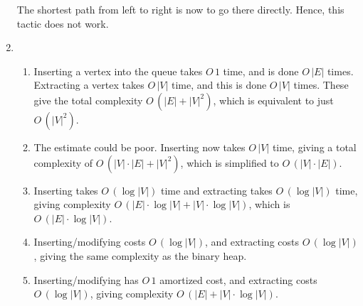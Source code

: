 \documentclass[11pt]{article}
\begin{document}
\begin{enumerate}

  The shortest path from left to right is now to go there directly. Hence, this tactic does not work.
\item
  \begin{enumerate}
    \item Inserting a vertex into the queue takes \(O\,1\) time, and is done \(O\,|E|\) times. Extracting a vertex takes \(O\,|V|\) time, and this is done \(O\,|V|\) times. These give the total complexity \(O\,(|E|+|V|^2)\), which is equivalent to just \(O\,(|V|^2)\).
    \item The estimate could be poor. Inserting now takes \(O\,|V|\) time, giving a total complexity of \(O\,(|V|\cdot|E|+|V|^2)\), which is simplified to \(O\,(|V|\cdot|E|)\).
    \item Inserting takes \(O\,(\log{|V|})\) time and extracting takes \(O\,(\log{|V|})\) time, giving complexity \(O\,(|E|\cdot\log{|V|}+|V|\cdot\log{|V|})\), which is \(O\,(|E|\cdot\log{|V|})\).
    \item Inserting/modifying costs \(O\,(\log{|V|})\), and extracting costs \(O\,(\log{|V|})\), giving the same complexity as the binary heap.
    \item Inserting/modifying has \(O\,1\) amortized cost, and extracting costs \(O\,(\log{|V|})\), giving complexity \(O\,(|E|+|V|\cdot\log{|V|})\).
  \end{enumerate}
\end{enumerate}
\end{document}
